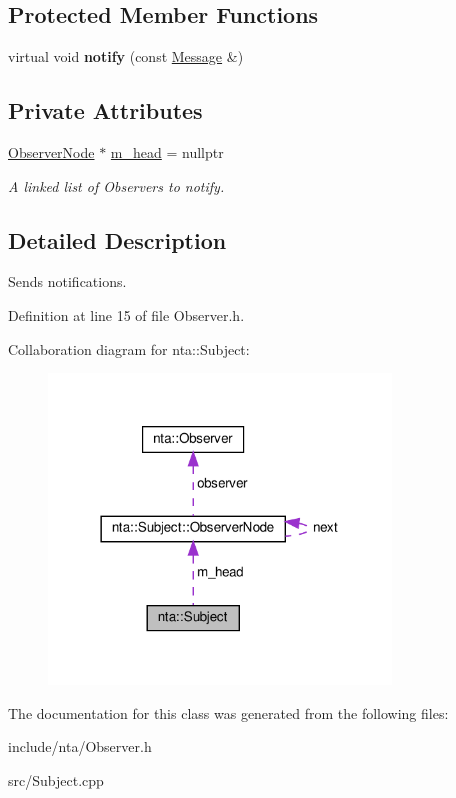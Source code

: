 \subsection*{Protected Member Functions}
\begin{DoxyCompactItemize}
\item 
\mbox{\label{classnta_1_1Subject_a5f52e0bcb0662b943a49f7dcde00f4c5}} 
virtual void {\bfseries notify} (const \hyperlink{structnta_1_1Message}{Message} \&)
\end{DoxyCompactItemize}
\subsection*{Private Attributes}
\begin{DoxyCompactItemize}
\item 
\mbox{\label{classnta_1_1Subject_a7049999f4dcfbaa6ce6af23a98ff2027}} 
\hyperlink{structnta_1_1Subject_1_1ObserverNode}{Observer\+Node} $\ast$ \hyperlink{classnta_1_1Subject_a7049999f4dcfbaa6ce6af23a98ff2027}{m\+\_\+head} = nullptr
\begin{DoxyCompactList}\small\item\em A linked list of Observers to notify. \end{DoxyCompactList}\end{DoxyCompactItemize}


\subsection{Detailed Description}
Sends notifications. 

Definition at line 15 of file Observer.\+h.



Collaboration diagram for nta\+:\+:Subject\+:\nopagebreak
\begin{figure}[H]
\begin{center}
\leavevmode
\includegraphics[width=258pt]{d5/d37/classnta_1_1Subject__coll__graph}
\end{center}
\end{figure}


The documentation for this class was generated from the following files\+:\begin{DoxyCompactItemize}
\item 
include/nta/Observer.\+h\item 
src/Subject.\+cpp\end{DoxyCompactItemize}
